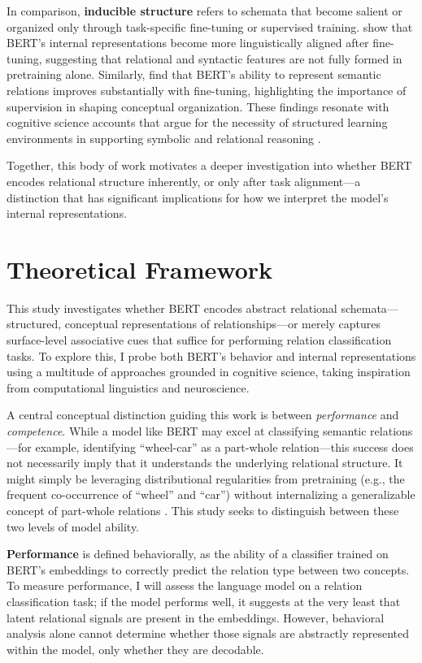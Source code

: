 \documentclass[stu,floatsintext]{apa7}
\begin{document}
In comparison, \textbf{inducible structure} refers to schemata that become salient or organized only through task-specific fine-tuning or supervised training. \textcite{tenney-etal-2019-bert} show that BERT's internal representations become more linguistically aligned after fine-tuning, suggesting that relational and syntactic features are not fully formed in pretraining alone. Similarly, \textcite{merchant-etal-2020-happens} find that BERT’s ability to represent semantic relations improves substantially with fine-tuning, highlighting the importance of supervision in shaping conceptual organization. These findings resonate with cognitive science accounts that argue for the necessity of structured learning environments in supporting symbolic and relational reasoning \parencite{Lake2017}.

Together, this body of work motivates a deeper investigation into whether BERT encodes relational structure inherently, or only after task alignment—a distinction that has significant implications for how we interpret the model's internal representations.

\section{Theoretical Framework}

This study investigates whether BERT encodes abstract relational schemata—structured, conceptual representations of relationships—or merely captures surface-level associative cues that suffice for performing relation classification tasks. To explore this, I probe both BERT's behavior and internal representations using a multitude of approaches grounded in cognitive science, taking inspiration from computational linguistics and neuroscience.

A central conceptual distinction guiding this work is between \textit{performance} and \textit{competence}. While a model like BERT may excel at classifying semantic relations—for example, identifying ``wheel-car'' as a part-whole relation—this success does not necessarily imply that it understands the underlying relational structure. It might simply be leveraging distributional regularities from pretraining (e.g., the frequent co-occurrence of ``wheel'' and ``car'') without internalizing a generalizable concept of part-whole relations \parencite{Bender2020}. This study seeks to distinguish between these two levels of model ability.

\textbf{Performance} is defined behaviorally, as the ability of a classifier trained on BERT's embeddings to correctly predict the relation type between two concepts. To measure performance, I will assess the language model on a relation classification task; if the model performs well, it suggests at the very least that latent relational signals are present in the embeddings. However, behavioral analysis alone cannot determine whether those signals are abstractly represented within the model, only whether they are decodable.
\end{document}
